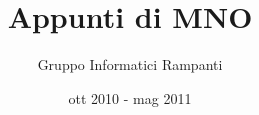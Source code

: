 \newenvironment{notes}{%
  \def\FrameCommand{\colorbox{yellow}}%
  \MakeFramed {\FrameRestore}
\texttt{[image: imgs/bulb.png]}
 \textbf{Nota} \\
 }%
{\endMakeFramed}

\newenvironment{workinprogress}{%
  \def\FrameCommand{\colorbox{pink}}%
  \MakeFramed {\FrameRestore}
\lhdbend  \textbf{Work in progress} \\
 }%
{\endMakeFramed}

\newenvironment{openquestion}{%
  \def\FrameCommand{\colorbox{pink}}%
  \MakeFramed {\FrameRestore}
 \textbf{Domanda aperta} \\
 }%
{\endMakeFramed}

\newenvironment{todo}{%
  \def\FrameCommand{\colorbox{pink}}%
  \MakeFramed {\FrameRestore}
 \textbf{TODO} \\
 }%
{\endMakeFramed}

\pagestyle{fancy}
\renewcommand{\chaptermark}[1]{\markboth{#1}{}}
\renewcommand{\sectionmark}[1]{\markright{\thesection\ #1}}
\fancyhf{} %
\fancyhead[LE,RO]{\bfseries\thepage}
\fancyhead[LO]{\bfseries\rightmark}
\fancyhead[RE]{\bfseries\leftmark}
\renewcommand{\headrulewidth}{0.5pt}
\renewcommand{\footrulewidth}{0pt}
\addtolength{\headheight}{0.5pt} %
\fancypagestyle{plain}{%
\fancyhead{} %
\renewcommand{\headrulewidth}{0pt} %
}




\setcounter{tocdepth}{3}
\setcounter{secnumdepth}{3}


\title{Appunti di MNO}
\author{Gruppo Informatici Rampanti}
\date{ott 2010 - mag 2011}



